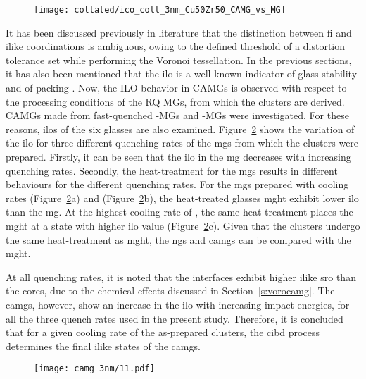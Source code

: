 \begin{figure}[!h] \centering
\texttt{[image: collated/ico\_coll\_3nm\_Cu50Zr50\_CAMG\_vs\_MG]}
\label{f:camg_fi}
\end{figure}

\begin{changebar}
It has been discussed previously in literature \cite{Ding2014} that the distinction between \gls{fi} and \gls{ilike} coordinations is ambiguous, owing to the defined threshold of a distortion tolerance set while performing the Voronoi tessellation. In the previous sections, it has also been mentioned that the \gls{ilo} is a well-known indicator of glass stability and of packing \cite{Ding2014,Ding2014a,Yue2018,Cheng2008}. Now, the ILO behavior in CAMGs is observed with respect to the processing conditions of the RQ MGs, from which the clusters are derived. CAMGs made from fast-quenched -MGs and 
-MGs were investigated. For these reasons, \gls{ilo}s of the six glasses are also examined. Figure~\ref{f:camg_ilo} shows the variation of the \gls{ilo} for three different quenching rates of the \gls{mg}s from which the clusters were prepared. Firstly, it can be seen that the \gls{ilo} in the \gls{mg} decreases with increasing quenching rates. Secondly, the heat-treatment for the \gls{mg}s results in different behaviours for the different quenching rates. For the \gls{mg}s prepared with cooling rates  (Figure~\ref{f:camg_ilo}a) and  (Figure~\ref{f:camg_ilo}b), the heat-treated glasses \gls{mght} exhibit lower \gls{ilo} than the \gls{mg}. At the highest cooling rate of , the same heat-treatment places the \gls{mght} at a state with higher \gls{ilo} value (Figure~\ref{f:camg_ilo}c). Given that the clusters undergo the same heat-treatment as \gls{mght}, the \gls{ng}s and \gls{camg}s can be compared with the \gls{mght}. \par

At all quenching rates, it is noted that the interfaces exhibit higher \gls{ilike} \gls{sro} than the cores, due to the chemical effects discussed in Section~\ref{s:vorocamg}. The \gls{camg}s, however, show an increase in the \gls{ilo} with increasing impact energies, for all the three quench rates used in the present study. Therefore, it is concluded that for a given cooling rate of the as-prepared clusters, the \gls{cibd} process determines the final \gls{ilike} states of the \gls{camg}s. \par

\begin{figure}[!h]
	\texttt{[image: camg\_3nm/11.pdf]}
	\label{f:camg_ilo}
\end{figure}
\end{changebar}

